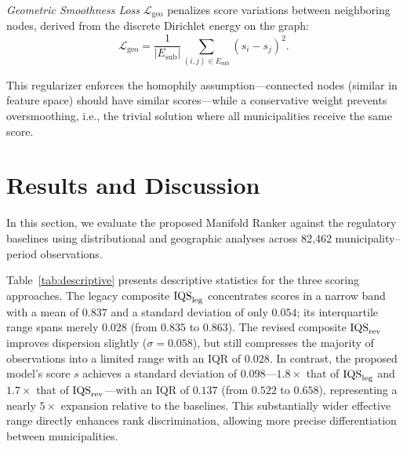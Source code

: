 \documentclass[english]{sbrt}
\begin{document}
\textit{Geometric Smoothness Loss} $\mathcal{L}_\mathrm{geo}$ penalizes score variations between neighboring nodes, derived from the discrete Dirichlet energy on the graph:
\begin{equation}
     \mathcal{L}_{\mathrm{geo}} = \frac{1}{|E_{\mathrm{sub}}|} \sum_{(i,j) \in E_{\mathrm{sub}}} (s_i - s_j)^2.
\end{equation}

\noindent
This regularizer enforces the homophily assumption---connected nodes (similar in feature space) should have similar scores---while a conservative weight prevents oversmoothing, i.e., the trivial solution where all municipalities receive the same score.

\section{Results and Discussion} \label{sec:results}

In this section, we evaluate the proposed Manifold Ranker against the regulatory baselines using distributional and geographic analyses across 82{,}462 municipality--period observations.

Table~\ref{tab:descriptive} presents descriptive statistics for the three scoring approaches. The legacy composite $\mathrm{IQS}_\mathrm{leg}$ concentrates scores in a narrow band with a mean of $0.837$ and a standard deviation of only $0.054$; its interquartile range spans merely $0.028$ (from $0.835$ to $0.863$). The revised composite $\mathrm{IQS}_\mathrm{rev}$ improves dispersion slightly ($\sigma = 0.058$), but still compresses the majority of observations into a limited range with an IQR of $0.028$. In contrast, the proposed model's score $s$ achieves a standard deviation of $0.098$---$1.8\times$ that of $\mathrm{IQS}_\mathrm{leg}$ and $1.7\times$ that of $\mathrm{IQS}_\mathrm{rev}$---with an IQR of $0.137$ (from $0.522$ to $0.658$), representing a nearly $5\times$ expansion relative to the baselines. This substantially wider effective range directly enhances rank discrimination, allowing more precise differentiation between municipalities.
\end{document}
